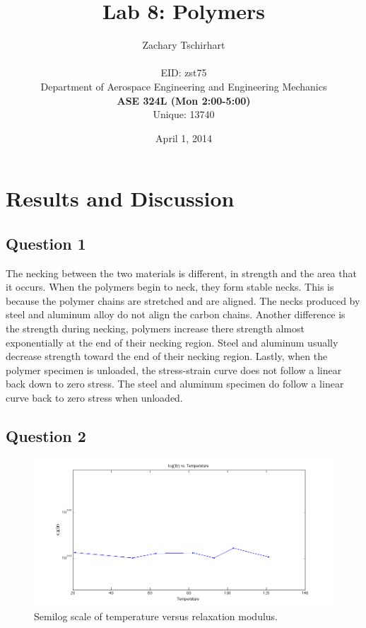 \documentclass[12pt]{report}
\title{Lab 8: Polymers}
\author{Zachary Tschirhart \\
	\small \\
        \small EID: zst75 \\
	\small Department of Aerospace Engineering and Engineering Mechanics \\
	\small \textbf{ASE 324L (Mon 2:00-5:00)} \\
	\small Unique: 13740}
\date{April 1, 2014}
\begin{document}
\maketitle

\setcounter{secnumdepth}{0}

\section{Results and Discussion}
\doublespacing

\subsection{Question 1}

The necking between the two materials is different, in strength and the area that it occurs. When the polymers begin to neck, they form stable necks. This is because the polymer chains are stretched and are aligned. The necks produced by steel and aluminum alloy do not align the carbon chains. Another difference is the strength during necking, polymers increase there strength almost exponentially at the end of their necking region. Steel and aluminum usually decrease strength toward the end of their necking region. Lastly, when the polymer specimen is unloaded, the stress-strain curve does not follow a linear back down to zero stress. The steel and aluminum specimen do follow a linear curve back to zero stress when unloaded.

\subsection{Question 2}
\begin{figure}[H]
	\includegraphics[width=1\textwidth]{problem2.png}
	\caption{Semilog scale of temperature versus relaxation modulus.}
	\label{fig:Figure1}
\end{figure}
\end{document}
